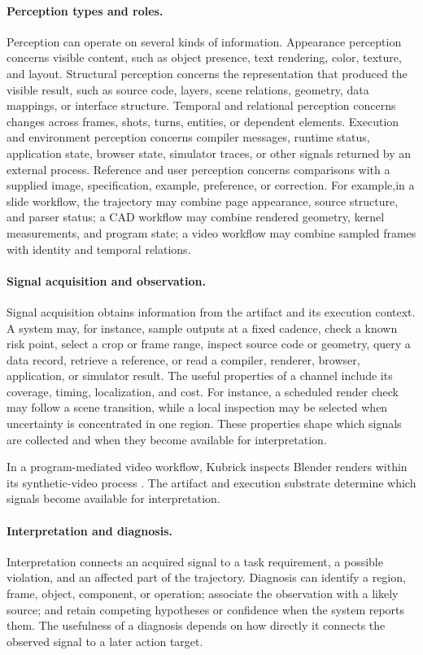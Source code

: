 \paragraph{Perception types and roles.}
Perception can operate on several kinds of information. Appearance perception concerns visible content, such as object presence, text rendering, color, texture, and layout. Structural perception concerns the representation that produced the visible result, such as source code, layers, scene relations, geometry, data mappings, or interface structure. Temporal and relational perception concerns changes across frames, shots, turns, entities, or dependent elements. Execution and environment perception concerns compiler messages, runtime status, application state, browser state, simulator traces, or other signals returned by an external process. Reference and user perception concerns comparisons with a supplied image, specification, example, preference, or correction. For example,in a slide workflow, the trajectory may combine page appearance, source structure, and parser status; a CAD workflow may combine rendered geometry, kernel measurements, and program state; a video workflow may combine sampled frames with identity and temporal relations.

\paragraph{Signal acquisition and observation.}
Signal acquisition obtains information from the artifact and its execution context. A system may, for instance, sample outputs at a fixed cadence, check a known risk point, select a crop or frame range, inspect source code or geometry, query a data record, retrieve a reference, or read a compiler, renderer, browser, application, or simulator result. The useful properties of a channel include its coverage, timing, localization, and cost. For instance, a scheduled render check may follow a scene transition, while a local inspection may be selected when uncertainty is concentrated in one region. These properties shape which signals are collected and when they become available for interpretation.

In a program-mediated video workflow, Kubrick inspects Blender renders within its synthetic-video process \cite{he2024kubrick}. The artifact and execution substrate determine which signals become available for interpretation.

\paragraph{Interpretation and diagnosis.}
Interpretation connects an acquired signal to a task requirement, a possible violation, and an affected part of the trajectory. Diagnosis can identify a region, frame, object, component, or operation; associate the observation with a likely source; and retain competing hypotheses or confidence when the system reports them. The usefulness of a diagnosis depends on how directly it connects the observed signal to a later action target. 

